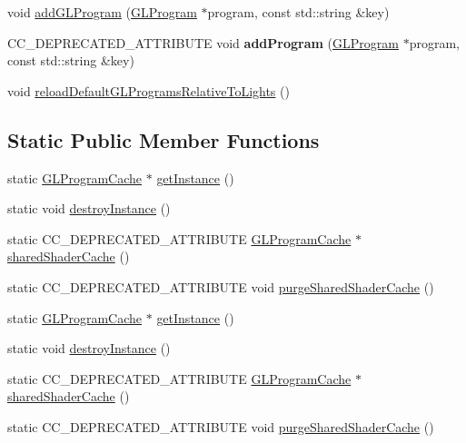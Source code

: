\begin{DoxyCompactItemize}
\item 
void \hyperlink{classGLProgramCache_a2a71f5f18bd022f43de7fc55f7e1252a}{add\+G\+L\+Program} (\hyperlink{classGLProgram}{G\+L\+Program} $\ast$program, const std\+::string \&key)
\item 
\mbox{\label{classGLProgramCache_a007167409343572fbf9839a83b80ee14}} 
C\+C\+\_\+\+D\+E\+P\+R\+E\+C\+A\+T\+E\+D\+\_\+\+A\+T\+T\+R\+I\+B\+U\+TE void {\bfseries add\+Program} (\hyperlink{classGLProgram}{G\+L\+Program} $\ast$program, const std\+::string \&key)
\item 
void \hyperlink{classGLProgramCache_a8b95bc69d3474d3678e39d45a042c980}{reload\+Default\+G\+L\+Programs\+Relative\+To\+Lights} ()
\end{DoxyCompactItemize}
\subsection*{Static Public Member Functions}
\begin{DoxyCompactItemize}
\item 
static \hyperlink{classGLProgramCache}{G\+L\+Program\+Cache} $\ast$ \hyperlink{classGLProgramCache_a084359da301355ed6c32b12689669d37}{get\+Instance} ()
\item 
static void \hyperlink{classGLProgramCache_a4a222023d3d21b6f4ed74077a4524e59}{destroy\+Instance} ()
\item 
static C\+C\+\_\+\+D\+E\+P\+R\+E\+C\+A\+T\+E\+D\+\_\+\+A\+T\+T\+R\+I\+B\+U\+TE \hyperlink{classGLProgramCache}{G\+L\+Program\+Cache} $\ast$ \hyperlink{classGLProgramCache_aecc703642bc0b29d37929d221cae41aa}{shared\+Shader\+Cache} ()
\item 
static C\+C\+\_\+\+D\+E\+P\+R\+E\+C\+A\+T\+E\+D\+\_\+\+A\+T\+T\+R\+I\+B\+U\+TE void \hyperlink{classGLProgramCache_a3cb3a02ba5cf4a83a1186974dc1e2955}{purge\+Shared\+Shader\+Cache} ()
\item 
static \hyperlink{classGLProgramCache}{G\+L\+Program\+Cache} $\ast$ \hyperlink{classGLProgramCache_a2d6118cf64da53c28c41c3c28e80265e}{get\+Instance} ()
\item 
static void \hyperlink{classGLProgramCache_aa4732816023ff32baff52867cd82d523}{destroy\+Instance} ()
\item 
static C\+C\+\_\+\+D\+E\+P\+R\+E\+C\+A\+T\+E\+D\+\_\+\+A\+T\+T\+R\+I\+B\+U\+TE \hyperlink{classGLProgramCache}{G\+L\+Program\+Cache} $\ast$ \hyperlink{classGLProgramCache_ad1c776cdc51aa5d36e529ccf3944716a}{shared\+Shader\+Cache} ()
\item 
static C\+C\+\_\+\+D\+E\+P\+R\+E\+C\+A\+T\+E\+D\+\_\+\+A\+T\+T\+R\+I\+B\+U\+TE void \hyperlink{classGLProgramCache_a5b1a5c9989fefbc71f6c2d558bf05cef}{purge\+Shared\+Shader\+Cache} ()
\end{DoxyCompactItemize}
